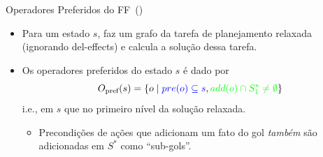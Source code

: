 \documentclass{beamer}
\begin{document}
\begin{frame}{Operadores Preferidos do FF~(\cite{Hoffmann.Nebel/2001})}
\begin{itemize}
\item Para um estado $s$, faz um grafo da tarefa de planejamento \alert{relaxada} (ignorando del-effects) e calcula a solução dessa tarefa.
\pause
\item Os operadores preferidos do estado $s$ é dado por $$O_{\text{pref}}(s) = \{o \mid {\color{blue} pre(o) \subseteq s}, {\color{green} add(o) \cap S_{1}^{*} \neq \emptyset} \}$$
i.e.,  em $s$ que  no primeiro nível da solução relaxada.
\pause
\begin{itemize}
\item \footnotesize Precondições de ações que adicionam um fato do gol \emph{também} são adicionadas em $S^{*}$ como ``sub-gols''.
\end{itemize}
\end{itemize}
\end{frame}
\end{document}
